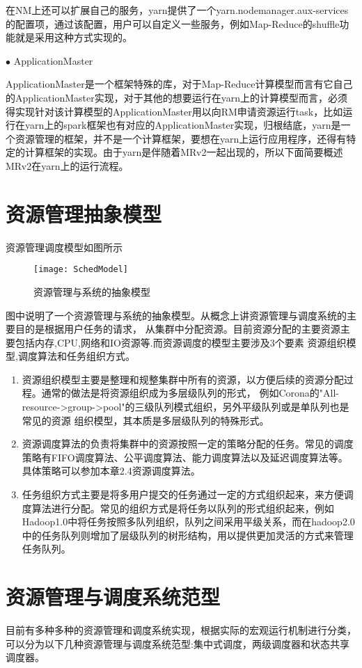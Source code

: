 在NM上还可以扩展自己的服务，yarn提供了一个yarn.nodemanager.aux-services的配置项，通过该配置，用户可以自定义一些服务，例如Map-Reduce的shuffle功能就是采用这种方式实现的。

$\bullet$ ApplicationMaster

ApplicationMaster是一个框架特殊的库，对于Map-Reduce计算模型而言有它自己的ApplicationMaster实现，对于其他的想要运行在yarn上的计算模型而言，必须得实现针对该计算模型的ApplicationMaster用以向RM申请资源运行task，比如运行在yarn上的spark框架也有对应的ApplicationMaster实现，归根结底，yarn是一个资源管理的框架，并不是一个计算框架，要想在yarn上运行应用程序，还得有特定的计算框架的实现。由于yarn是伴随着MRv2一起出现的，所以下面简要概述MRv2在yarn上的运行流程。

\section{资源管理抽象模型}
 
资源管理调度模型如图所示
\begin{figure}[htbp]
\centering\texttt{[image: SchedModel]}
\caption{资源管理与系统的抽象模型}\label{fig:SchedModel}
\end{figure}
图中说明了一个资源管理与系统的抽象模型。从概念上讲资源管理与调度系统的主要目的是根据用户任务的请求，
从集群中分配资源。目前资源分配的主要资源主要包括内存,CPU,网络和IO资源等.而资源调度的模型主要涉及3个要素
资源组织模型,调度算法和任务组织方式。
\begin{enumerate}
\item 资源组织模型主要是整理和规整集群中所有的资源，以方便后续的资源分配过程。通常的做法是将资源组织成为多层级队列的形式，
例如Corona的"All-resource->group->pool"的三级队列模式组织，另外平级队列或是单队列也是常见的资源
组织模型，其本质是多层级队列的特殊形式。
\item 资源调度算法的负责将集群中的资源按照一定的策略分配的任务。常见的调度策略有FIFO调度算法、公平调度算法、能力调度算法以及延迟调度算法等。具体策略可以参加本章2.4资源调度算法。
\item 任务组织方式主要是将多用户提交的任务通过一定的方式组织起来，来方便调度算法进行分配。常见的组织方式是将任务以队列的形式组织起来，例如Hadoop1.0中将任务按照多队列组织，队列之间采用平级关系，而在hadoop2.0中的任务队列则增加了层级队列的树形结构，用以提供更加灵活的方式来管理任务队列。
\end{enumerate}
\section{资源管理与调度系统范型}
目前有多种多种的资源管理和调度系统实现，根据实际的宏观运行机制进行分类，可以分为以下几种资源管理与调度系统范型:集中式调度，两级调度器和状态共享调度器。

